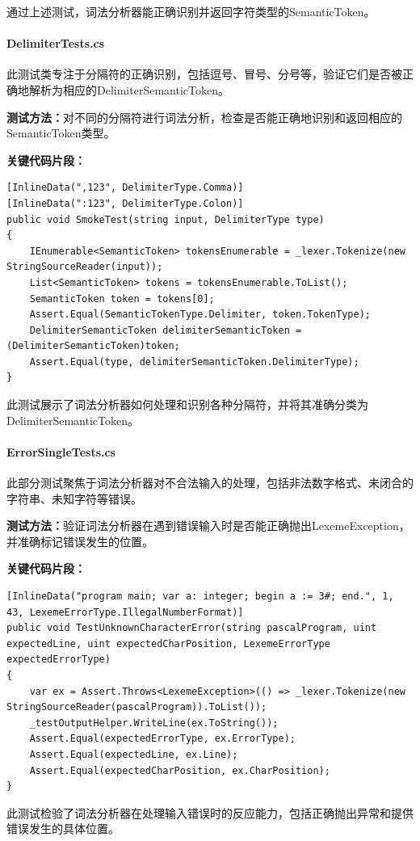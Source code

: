 \documentclass[../main.tex]{subfiles}
\begin{document}
通过上述测试，词法分析器能正确识别并返回字符类型的SemanticToken。

\paragraph{DelimiterTests.cs}

此测试类专注于分隔符的正确识别，包括逗号、冒号、分号等，验证它们是否被正确地解析为相应的DelimiterSemanticToken。

\textbf{测试方法：}对不同的分隔符进行词法分析，检查是否能正确地识别和返回相应的SemanticToken类型。

\textbf{关键代码片段：}
\begin{lstlisting}[style=csharp]
[InlineData(",123", DelimiterType.Comma)]
[InlineData(":123", DelimiterType.Colon)]
public void SmokeTest(string input, DelimiterType type)
{
    IEnumerable<SemanticToken> tokensEnumerable = _lexer.Tokenize(new StringSourceReader(input));
    List<SemanticToken> tokens = tokensEnumerable.ToList();
    SemanticToken token = tokens[0];
    Assert.Equal(SemanticTokenType.Delimiter, token.TokenType);
    DelimiterSemanticToken delimiterSemanticToken = (DelimiterSemanticToken)token;
    Assert.Equal(type, delimiterSemanticToken.DelimiterType);
}
\end{lstlisting}

此测试展示了词法分析器如何处理和识别各种分隔符，并将其准确分类为DelimiterSemanticToken。

\paragraph{ErrorSingleTests.cs}
此部分测试聚焦于词法分析器对不合法输入的处理，包括非法数字格式、未闭合的字符串、未知字符等错误。

\textbf{测试方法：}验证词法分析器在遇到错误输入时是否能正确抛出LexemeException，并准确标记错误发生的位置。

\textbf{关键代码片段：}
\begin{lstlisting}[style=csharp]
[InlineData("program main; var a: integer; begin a := 3#; end.", 1, 43, LexemeErrorType.IllegalNumberFormat)]
public void TestUnknownCharacterError(string pascalProgram, uint expectedLine, uint expectedCharPosition, LexemeErrorType expectedErrorType)
{
    var ex = Assert.Throws<LexemeException>(() => _lexer.Tokenize(new StringSourceReader(pascalProgram)).ToList());
    _testOutputHelper.WriteLine(ex.ToString());
    Assert.Equal(expectedErrorType, ex.ErrorType);
    Assert.Equal(expectedLine, ex.Line);
    Assert.Equal(expectedCharPosition, ex.CharPosition);
}
\end{lstlisting}
此测试检验了词法分析器在处理输入错误时的反应能力，包括正确抛出异常和提供错误发生的具体位置。
\end{document}
